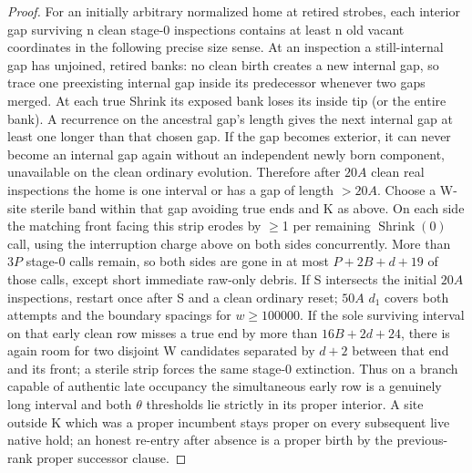 \begin{proof}
For an initially arbitrary normalized home at retired strobes, each interior gap surviving n clean stage-0 inspections contains at least n old vacant coordinates in the following precise size sense. At an inspection a still-internal gap has unjoined, retired banks: no clean birth creates a new internal gap, so trace one preexisting internal gap inside its predecessor whenever two gaps merged. At each true Shrink its exposed bank loses its inside tip (or the entire bank). A recurrence on the ancestral gap's length gives the next internal gap at least one longer than that chosen gap. If the gap becomes exterior, it can never become an internal gap again without an independent newly born component, unavailable on the clean ordinary evolution. Therefore after \(20A\) clean real inspections the home is one interval or has a gap of length \(>20A\). Choose a W-site sterile band within that gap avoiding true ends and K as above. On each side the matching front facing this strip erodes by \(\ge\)1 per remaining \(\operatorname{Shrink}(0)\) call, using the interruption charge above on both sides concurrently. More than \(3P\) stage-0 calls remain, so both sides are gone in at most \(P+2B+d+19\) of those calls, except short immediate raw-only debris. If S intersects the initial \(20A\) inspections, restart once after S and a clean ordinary reset; \(50A\) \(d_1\) covers both attempts and the boundary spacings for \(w\ge 100000\). If the sole surviving interval on that early clean row misses a true end by more than \(16B+2d+24\), there is again room for two disjoint W candidates separated by \(d+2\) between that end and its front; a sterile strip forces the same stage-0 extinction. Thus on a branch capable of authentic late occupancy the simultaneous early row is a genuinely long interval and both \(\theta\) thresholds lie strictly in its proper interior. A site outside K which was a proper incumbent stays proper on every subsequent live native hold; an honest re-entry after absence is a proper birth by the previous-rank proper successor clause.


\end{proof}
